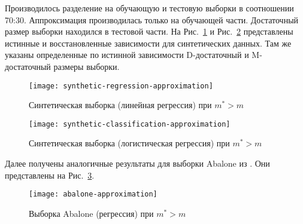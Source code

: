 Производилось разделение на обучающую и тестовую выборки в соотношении 70:30. Аппроксимация производилась только на обучающей части. Достаточный размер выборки находился в тестовой части. На Рис.~\ref{synthetic-regression-approximation} и Рис.~\ref{synthetic-classification-approximation} представлены истинные и восстановленные зависимости для синтетических данных. Там же указаны определенные по истинной зависимости D-достаточный и M-достаточный размеры выборки. 

\begin{figure}[h!]
    \centering
    \texttt{[image: synthetic-regression-approximation]}
    \caption{Синтетическая выборка (линейная регрессия) при $m^* > m$}
    \label{synthetic-regression-approximation}
\end{figure}

\begin{figure}[h!]
    \centering
    \texttt{[image: synthetic-classification-approximation]}
    \caption{Синтетическая выборка (логистическая регрессия) при $m^* > m$}
    \label{synthetic-classification-approximation}
\end{figure}

Далее получены аналогичные результаты для выборки Abalone из \citep{UCI}. Они представлены на Рис.~\ref{abalone-approximation}.

\begin{figure}[h!]
    \centering
    \texttt{[image: abalone-approximation]}
    \caption{Выборка Abalone (регрессия) при $m^* > m$}
    \label{abalone-approximation}
\end{figure}